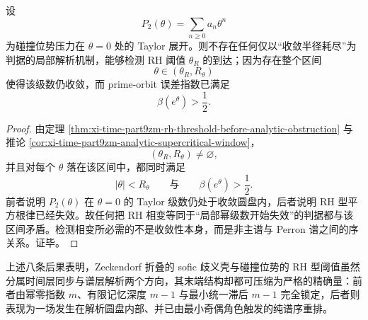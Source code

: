 \begin{corollary}[局部累积量体系无法以收敛半径失效来预告 RH 相变]\label{cor:xi-time-part9zm-local-cumulant-radius-cannot-detect-rh-threshold}
设
\[
P_2(\theta)=\sum_{n\ge 0} a_n\theta^n
\]
为碰撞位势压力在 \(\theta=0\) 处的 Taylor 展开。则不存在任何仅以“收敛半径耗尽”为判据的局部解析机制，能够检测 RH 阈值 \(\theta_R\) 的到达；因为存在整个区间
\[
\theta\in(\theta_R,R_\theta)
\]
使得该级数仍收敛，而 prime-orbit 误差指数已满足
\[
\beta(e^\theta)>\frac12.
\]
\end{corollary}
\begin{proof}
由定理 \ref{thm:xi-time-part9zm-rh-threshold-before-analytic-obstruction} 与推论 \ref{cor:xi-time-part9zm-analytic-supercritical-window}，
\[
(\theta_R,R_\theta)\neq\varnothing,
\]
并且对每个 \(\theta\) 落在该区间中，都同时满足
\[
|\theta|<R_\theta
\qquad\text{与}\qquad
\beta(e^\theta)>\frac12.
\]
前者说明 \(P_2(\theta)\) 在 \(\theta=0\) 的 Taylor 级数仍处于收敛圆盘内，后者说明 RH 型平方根律已经失效。故任何把 RH 相变等同于“局部幂级数开始失效”的判据都与该区间矛盾。检测相变所必需的不是收敛性本身，而是非主谱与 Perron 谱之间的序关系。证毕。
\end{proof}

上述八条后果表明，Zeckendorf 折叠的 sofic 歧义壳与碰撞位势的 RH 型阈值虽然分属时间层同步与谱层解析两个方向，其末端结构却都可压缩为严格的精确量：前者由幂零指数 \(m\)、有限记忆深度 \(m-1\) 与最小统一滞后 \(m-1\) 完全锁定，后者则表现为一场发生在解析圆盘内部、并已由最小奇偶角色触发的纯谱序重排。
